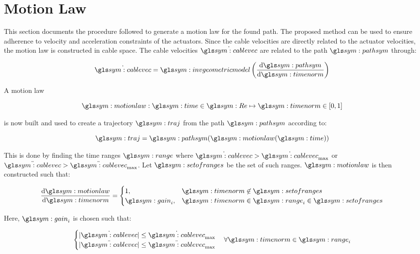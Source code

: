 \section{Motion Law}

	This section documents the procedure followed to generate a motion law for
	the found path. The proposed method can be used to ensure adherence to
	velocity and acceleration constraints of the actuators. Since the cable
	velocities are directly related to the actuator velocities, the motion law
	is constructed in cable space. The cable velocities $\dot{\cablevec}$ are
	related to the path $\pathsym$ through:

	\begin{equation}
		\dot{\cablevec} = \invgeometricmodel
							\left(
								\frac
								{
									\der \pathsym
								}
								{
									\der \timenorm
								}
							\right)
	\end{equation}

	A motion law

	\begin{equation}
		\motionlaw : \timesym \in \Re \mapsto \timenorm \in [0, 1]
	\end{equation}

	is now built and used to create a trajectory $\traj$ from the
	path $\pathsym$ according to:

	\begin{equation}
		\traj = \pathsym(\motionlaw(\timesym))
	\end{equation}

	This is done by finding the time ranges $\range$ where $\dot{\cablevec} >
	\dot{\cablevec}_{\max}$ or $\ddot{\cablevec} > \ddot{\cablevec}_{\max}$. Let
	$\setofranges$ be the set of such ranges. $\motionlaw$ is then constructed
	such that:

	\begin{equation}
		\frac
		{
			\der\motionlaw
		}
		{
			\der\timenorm
		}
		=
		\begin{cases}
			1,			&\timenorm \not\in \setofranges\\
			\gain_i,	&\timenorm \in \range_i \in \setofranges
		\end{cases}
		\label{eq:motion_law_construction}
	\end{equation}

	Here, $\gain_i$ is chosen such that:

	\begin{equation}
		\begin{cases}
			|\dot{\cablevec}| \leq \dot{\cablevec}_{\max}\\
			|\ddot{\cablevec}| \leq \ddot{\cablevec}_{\max}\\
		\end{cases}
			\forall\timenorm\in\range_i
	\end{equation}

